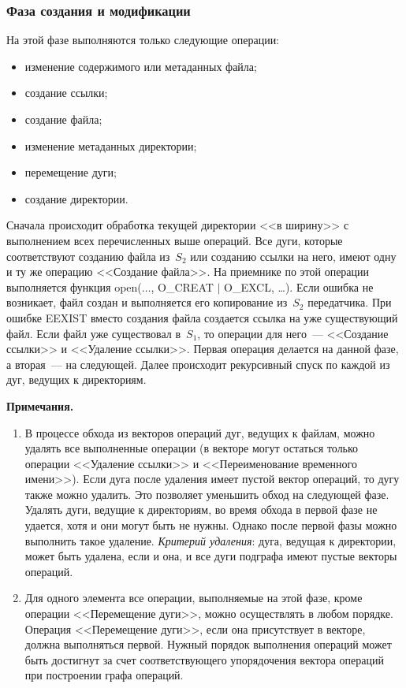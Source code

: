 \begin{multicols}{2}
\vspace*{-3pt}
\subsubsection{Фаза создания и модификации} %
\vspace*{-1pt}
      
      На этой фазе выполняются только следующие операции:
      \pagebreak
      
      \noindent
\begin{itemize}
\item изменение содержимого или метаданных \mbox{файла;}
\item создание ссылки;
\item создание файла;
\item изменение метаданных директории;
\item перемещение дуги;
\item создание директории.
\end{itemize}

      Сначала происходит обработка текущей директории <<в ширину>> с 
выполнением всех перечисленных выше операций. Все дуги, которые 
соответствуют созданию файла из~$S_2$ или созданию ссылки на него, имеют 
одну и ту же операцию <<Создание файла>>. На приемнике по этой операции 
выполняется функция open($\ldots$, O\_CREAT $\vert$ O\_EXCL, \ldots). Если 
ошибка не возникает, файл создан и выполняется его копирование из~$S_2$ 
передатчика. При ошибке EEXIST вместо создания файла создается ссылка на 
уже существующий файл. Если файл уже существовал в~$S_1$, то операции для 
него~--- <<Создание ссылки>> и <<Удаление ссылки>>. Первая операция 
делается на данной фазе, а вторая~--- на следующей. Далее происходит 
рекурсивный спуск по каждой из дуг, ведущих к директориям.

\smallskip
\noindent
\textbf{Примечания.}

\noindent
{\sf 
\begin{enumerate}[1.] 
\item В процессе обхода из векторов операций дуг, ведущих к файлам, 
можно удалять все выполненные операции (в векторе могут остаться только 
операции <<Удаление ссылки>> и <<Переименование временного 
имени>>). Если дуга после удаления имеет пустой вектор операций, то дугу 
также можно удалить. Это позволяет уменьшить обход на следующей фазе. 
Удалять дуги, ведущие к директориям, во время обхода в первой фазе не 
удается, хотя и они могут быть не нужны. Однако после первой фазы можно 
выполнить такое удаление. \textit{Критерий удаления}: дуга, ведущая к 
директории, может быть удалена, если и она, и все дуги подграфа имеют 
пустые векторы операций.
\item Для одного элемента все операции, вы\-пол\-ня\-емые на этой фазе, кроме 
операции <<Перемещение дуги>>,  можно осуществлять в любом порядке. 
Операция <<Перемещение дуги>>, если она присутствует в векторе, должна 
выполняться первой. Нужный порядок выполнения операций может быть 
достигнут за счет соответствующего упорядочения вектора операций при 
построении графа операций.
\end{enumerate}}


\end{multicols}
